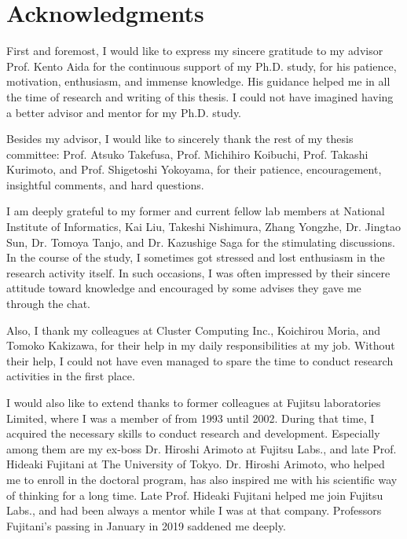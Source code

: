 \chapter*{Acknowledgments}

First and foremost, I would like to express my sincere gratitude to my advisor Prof. Kento Aida for the continuous support of my Ph.D. study, for his patience, motivation, enthusiasm, and immense knowledge.
His guidance helped me in all the time of research and writing of this thesis.
I could not have imagined having a better advisor and mentor for my Ph.D. study.

Besides my advisor, I would like to sincerely thank the rest of my thesis committee: Prof. Atsuko Takefusa, Prof. Michihiro Koibuchi, Prof. Takashi Kurimoto, and Prof. Shigetoshi Yokoyama, for their patience, encouragement, insightful comments, and hard questions.

I am deeply grateful to my former and current fellow lab members at National Institute of Informatics, Kai Liu, Takeshi Nishimura, Zhang Yongzhe, Dr. Jingtao Sun, Dr. Tomoya Tanjo, and Dr. Kazushige Saga for the stimulating discussions.
In the course of the study, I sometimes got stressed and lost enthusiasm in the research activity itself.
In such occasions, I was often impressed by their sincere attitude toward knowledge and encouraged by some advises they gave me through the chat.




Also, I thank my colleagues at Cluster Computing Inc., Koichirou Moria, and Tomoko Kakizawa, for their help in my daily responsibilities at my job.
Without their help, I could not have even managed to spare the time to conduct research activities in the first place.



I would also like to extend thanks to former colleagues at Fujitsu laboratories Limited, where I was a member of from 1993 until 2002.
During that time, I acquired the necessary skills to conduct research and development.
Especially among them are my ex-boss Dr. Hiroshi Arimoto at Fujitsu Labs., and late Prof. Hideaki Fujitani at The University of Tokyo.
Dr. Hiroshi Arimoto, who helped me to enroll in the doctoral program, has also inspired me with his scientific way of thinking for a long time.
Late Prof. Hideaki Fujitani helped me join Fujitsu Labs., and had been always a mentor while I was at that company.
Professors Fujitani's passing in January in 2019 saddened me deeply.



